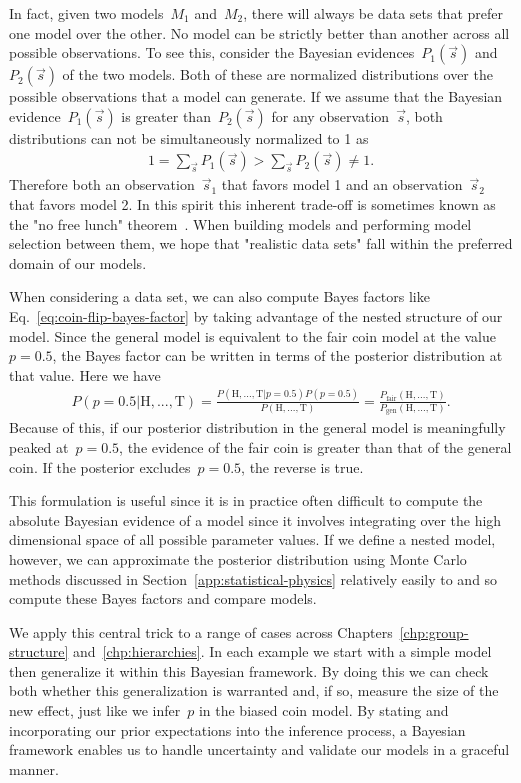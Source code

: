 In fact, given two models~$M_1$ and~$M_2$, there will always be data sets that prefer one model over the other. No model can be strictly better than another across all possible observations. To see this, consider the Bayesian evidences~$P_1(\vec{s})$ and~$P_2(\vec{s})$ of the two models. Both of these are normalized distributions over the possible observations that a model can generate. If we assume that the Bayesian evidence~$P_1(\vec{s})$ is greater than~$P_2(\vec{s})$ for any observation~$\vec{s}$, both distributions can not be simultaneously normalized to 1 as \begin{align}
    1 = \sum_{\vec{s}} P_1(\vec{s}) > \sum_{\vec{s}} P_2(\vec{s}) \not= 1.
\end{align}
Therefore both an observation~$\vec{s}_1$ that favors model 1 and an observation~$\vec{s}_2$ that favors model 2. In this spirit this inherent trade-off is sometimes known as the "no free lunch" theorem~\cite{Peixoto17}. When building models and performing model selection between them, we hope that "realistic data sets" fall within the preferred domain of our models. 

When considering a data set, we can also compute Bayes factors like Eq.~\eqref{eq:coin-flip-bayes-factor} by taking advantage of the nested structure of our model. Since the general model is equivalent to the fair coin model at the value~$p = 0.5$, the Bayes factor can be written in terms of the posterior distribution at that value. Here we have \begin{align}
    P(p = 0.5|\text{H},...,\text{T}) = \frac{P(\text{H},...,\text{T}|p = 0.5)P(p = 0.5)}{P(\text{H},...,\text{T})} = \frac{P_{\text{fair}}(\text{H},...,\text{T})}{P_{\text{gen}}(\text{H},...,\text{T})}.
\end{align}
Because of this, if our posterior distribution in the general model is meaningfully peaked at~$p = 0.5$, the evidence of the fair coin is greater than that of the general coin. If the posterior excludes~$p = 0.5$, the reverse is true. 

This formulation is useful since it is in practice often difficult to compute the absolute Bayesian evidence of a model since it involves integrating over the high dimensional space of all possible parameter values. If we define a nested model, however, we can approximate the posterior distribution using Monte Carlo methods discussed in Section~\ref{app:statistical-physics} relatively easily to and so compute these Bayes factors and compare models. 

We apply this central trick to a range of cases across Chapters~\ref{chp:group-structure} and~\ref{chp:hierarchies}. In each example we start with a simple model then generalize it within this Bayesian framework. By doing this we can check both whether this generalization is warranted and, if so, measure the size of the new effect, just like we infer~$p$ in the biased coin model. By stating and incorporating our prior expectations into the inference process, a Bayesian framework enables us to handle uncertainty and validate our models in a graceful manner.